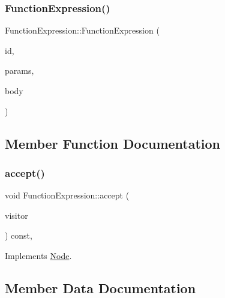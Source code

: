 \subsubsection{\texorpdfstring{Function\+Expression()}{FunctionExpression()}}
{\footnotesize\ttfamily Function\+Expression\+::\+Function\+Expression (\begin{DoxyParamCaption}\item[{\hyperlink{struct_identifier}{Identifier} $\ast$}]{id,  }\item[{\hyperlink{struct_formal_parameter_list}{Formal\+Parameter\+List} $\ast$}]{params,  }\item[{\hyperlink{struct_function_body}{Function\+Body} $\ast$}]{body }\end{DoxyParamCaption})\hspace{0.3cm}{\ttfamily [inline]}}



\subsection{Member Function Documentation}
\mbox{\label{struct_function_expression_a4808466a4242254555340a7e9c5e6dac}} 
\subsubsection{\texorpdfstring{accept()}{accept()}}
{\footnotesize\ttfamily void Function\+Expression\+::accept (\begin{DoxyParamCaption}\item[{\hyperlink{struct_visitor}{Visitor} \&}]{visitor }\end{DoxyParamCaption}) const\hspace{0.3cm}{\ttfamily [inline]}, {\ttfamily [virtual]}}



Implements \hyperlink{struct_node_a10bd7af968140bbf5fa461298a969c71}{Node}.



\subsection{Member Data Documentation}
\mbox{\label{struct_function_expression_af08f7dfdb616e122ab79c9a2e706061e}} 
